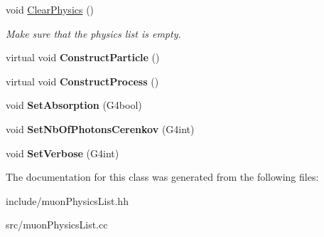 \begin{DoxyCompactItemize}
\mbox{\label{classmuonPhysicsList_a4a34c6141040c0d5bd34396df7d10ff3}} 
void \hyperlink{classmuonPhysicsList_a4a34c6141040c0d5bd34396df7d10ff3}{Clear\+Physics} ()
\begin{DoxyCompactList}\small\item\em Make sure that the physics list is empty. \end{DoxyCompactList}\item 
\mbox{\label{classmuonPhysicsList_aefb2f75ee5958cfcf78b50c479523703}} 
virtual void {\bfseries Construct\+Particle} ()
\item 
\mbox{\label{classmuonPhysicsList_aac0f8e3bd5e0509f96613e150554d06e}} 
virtual void {\bfseries Construct\+Process} ()
\item 
\mbox{\label{classmuonPhysicsList_afe6f5f4bcf37f721cd821753ace0b06d}} 
void {\bfseries Set\+Absorption} (G4bool)
\item 
\mbox{\label{classmuonPhysicsList_abf3b923807c3112086ea15a698d5666b}} 
void {\bfseries Set\+Nb\+Of\+Photons\+Cerenkov} (G4int)
\item 
\mbox{\label{classmuonPhysicsList_a459c2902a6bf45261961a67954324c9b}} 
void {\bfseries Set\+Verbose} (G4int)
\end{DoxyCompactItemize}


The documentation for this class was generated from the following files\+:\begin{DoxyCompactItemize}
\item 
include/muon\+Physics\+List.\+hh\item 
src/muon\+Physics\+List.\+cc\end{DoxyCompactItemize}

